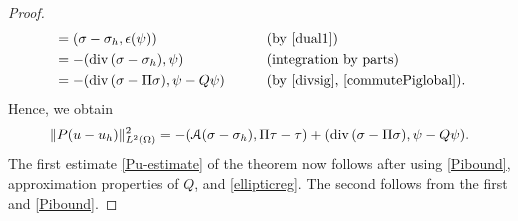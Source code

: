 \documentclass[12pt]{amsart}
\numberwithin{equation}{section}
\theoremstyle{definition}
\theoremstyle{remark}
\renewcommand{\(}{\bigl(}
\renewcommand{\)}{\bigr)}
\newcommand{\dive}{{\ensuremath\mathop{\mathrm{div}\,}}} %
\begin{document}
\begin{proof}
\begin{alignat*}{2}
    & =  (\sigma-\sigma_h, \epsilon(\psi)) \qquad && \text{(by \eqref{dual1})} \\
    & =  -( \dive(\sigma-\sigma_h), \psi) \qquad && \text{(integration by parts)}  \\
    & =  -( \dive(\sigma-\Pi \sigma), \psi-Q \psi ) \qquad && \text{(by \eqref{divsig}, \eqref{commutePiglobal}).} 
\end{alignat*}
Hence, we obtain 
\begin{equation*}
    \| P(u-u_h)\|_{L^2(\Omega)}^2=  -( \mathcal{A}(\sigma-\sigma_h), \Pi \tau- \tau)+ ( \dive(\sigma-\Pi \sigma), \psi-Q \psi ).
\end{equation*}
The first estimate \eqref{Pu-estimate}  of the theorem now follows after using \eqref{Pibound}, approximation properties of $Q$, and \eqref{ellipticreg}. The second follows from the first and \eqref{Pibound}.
\end{proof}
\end{document}
